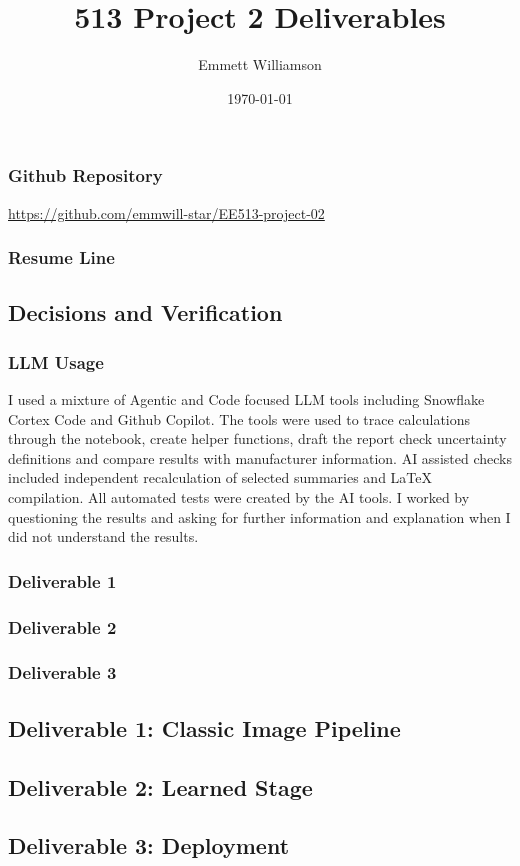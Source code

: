 \documentclass{article}
\title{513 Project 2 Deliverables}
\author{Emmett Williamson}
\date{\today}
\begin{document}
\maketitle

\subsubsection*{Github Repository}
\url{https://github.com/emmwill-star/EE513-project-02}

\subsubsection*{Resume Line}


\subsection*{Decisions and Verification}
\subsubsection*{LLM Usage}
I used a mixture of Agentic and Code focused LLM tools including Snowflake Cortex Code and Github Copilot.
The tools were used to trace calculations through the notebook, create helper functions, 
draft the report check uncertainty definitions and compare results with manufacturer 
information. AI assisted checks included independent recalculation of selected summaries and LaTeX compilation. 
All automated tests were created by the AI tools.  I worked by questioning the results and 
asking for further information and explanation when I did not understand the results.

\subsubsection*{Deliverable 1}

\subsubsection*{Deliverable 2}


\subsubsection*{Deliverable 3}


\subsection*{Deliverable 1: Classic Image Pipeline}

\subsection*{Deliverable 2: Learned Stage}


\subsection*{Deliverable 3: Deployment}
\end{document}
